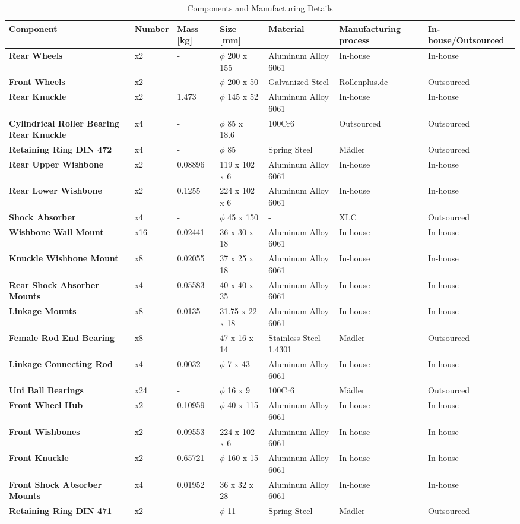 \begin{table}[H]
\centering
\caption{Components and Manufacturing Details}
\label{table:components}
\begin{adjustbox}{width=\textwidth,center}
\begin{tabular}{|>{\bfseries}m{3cm}|m{2cm}|m{1.5cm}|m{3cm}|m{2cm}|m{3cm}|m{2.5cm}|}
\hline
Component & Number & Mass [kg] & Size [mm] & Material & Manufacturing process & In-house/Outsourced \\
\hline
Rear Wheels & x2 & - & $\phi$ 200 x 155 & Aluminum Alloy 6061 & In-house & In-house \\
Front Wheels & x2 & - & $\phi$ 200 x 50 & Galvanized Steel & Rollenplus.de & Outsourced \\
Rear Knuckle & x2 & 1.473 & $\phi$ 145 x 52 & Aluminum Alloy 6061 & In-house & In-house \\
Cylindrical Roller Bearing Rear Knuckle & x4 & - & $\phi$ 85 x 18.6 & 100Cr6 & Outsourced & Outsourced \\
Retaining Ring DIN 472 & x4 & - & $\phi$ 85 & Spring Steel & Mädler & Outsourced \\
Rear Upper Wishbone & x2 & 0.08896 & 119 x 102 x 6 & Aluminum Alloy 6061 & In-house & In-house \\
Rear Lower Wishbone & x2 & 0.1255 & 224 x 102 x 6 & Aluminum Alloy 6061 & In-house & In-house \\
Shock Absorber & x4 & - & $\phi$ 45 x 150 & - & XLC & Outsourced \\
Wishbone Wall Mount & x16 & 0.02441 & 36 x 30 x 18 & Aluminum Alloy 6061 & In-house & In-house \\
Knuckle Wishbone Mount & x8 & 0.02055 & 37 x 25 x 18 & Aluminum Alloy 6061 & In-house & In-house \\
Rear Shock Absorber Mounts & x4 & 0.05583 & 40 x 40 x 35 & Aluminum Alloy 6061 & In-house & In-house \\
Linkage Mounts & x8 & 0.0135 & 31.75 x 22 x 18 & Aluminum Alloy 6061 & In-house & In-house \\
Female Rod End Bearing & x8 & - & 47 x 16 x 14 & Stainless Steel 1.4301 & Mädler & Outsourced \\
Linkage Connecting Rod & x4 & 0.0032 & $\phi$ 7 x 43 & Aluminum Alloy 6061 & In-house & In-house \\
Uni Ball Bearings & x24 & - & $\phi$ 16 x 9 & 100Cr6 & Mädler & Outsourced \\
Front Wheel Hub & x2 & 0.10959 & $\phi$ 40 x 115 & Aluminum Alloy 6061 & In-house & In-house \\
Front Wishbones & x2 & 0.09553 & 224 x 102 x 6 & Aluminum Alloy 6061 & In-house & In-house \\
Front Knuckle & x2 & 0.65721 & $\phi$ 160 x 15 & Aluminum Alloy 6061 & In-house & In-house \\
Front Shock Absorber Mounts & x4 & 0.01952 & 36 x 32 x 28 & Aluminum Alloy 6061 & In-house & In-house \\
Retaining Ring DIN 471 & x2 & - & $\phi$ 11 & Spring Steel & Mädler & Outsourced \\
\hline
\end{tabular}
\end{adjustbox}
\end{table}
